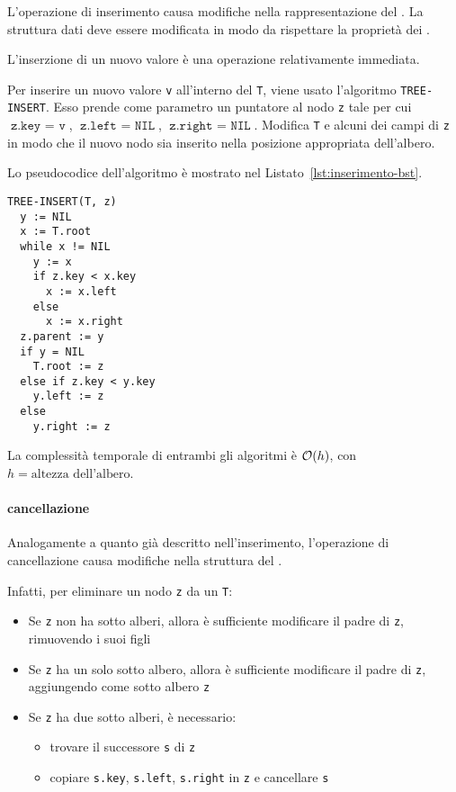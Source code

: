 \documentclass[italian, 10pt]{article}
\begin{document}
L'operazione di inserimento causa modifiche nella rappresentazione del \BST.
La struttura dati deve essere modificata in modo da rispettare la proprietà dei \BST.

L'inserzione di un nuovo valore è una operazione relativamente immediata.

Per inserire un nuovo valore \texttt{v} all'interno del \BST \texttt{T}, viene usato l'algoritmo \texttt{TREE-INSERT}.
Esso prende come parametro un puntatore al nodo \texttt{z} tale per cui \(\texttt{z.key } = \texttt{ v}\), \(\texttt{z.left } = \texttt{ NIL}\), \(\texttt{z.right } = \texttt{ NIL}\).
Modifica \texttt{T} e alcuni dei campi di \texttt{z} in modo che il nuovo nodo sia inserito nella posizione appropriata dell'albero.

Lo pseudocodice dell'algoritmo è mostrato nel Listato~\ref{lst:inserimento-bst}.

\begin{lstlisting}[style=pseudocode, caption={Inserimento di un nuovo nodo}, label={lst:inserimento-bst}]
TREE-INSERT(T, z)
  y := NIL
  x := T.root
  while x != NIL
    y := x
    if z.key < x.key
      x := x.left
    else
      x := x.right
  z.parent := y
  if y = NIL
    T.root := z
  else if z.key < y.key
    y.left := z
  else
    y.right := z
\end{lstlisting}

\bigskip
La complessità temporale di entrambi gli algoritmi è \(\mathcal{O}(h)\), con \(h = \text{altezza dell'albero}\).

\paragraph{cancellazione}
\label{par:cancellazione-bst}

Analogamente a quanto già descritto nell'inserimento, l'operazione di cancellazione causa modifiche nella struttura del \BST.

Infatti, per eliminare un nodo \texttt{z} da un \BST \texttt{T}:

\begin{itemize}
  \item Se \texttt{z} non ha sotto alberi, allora è sufficiente modificare il padre di \texttt{z}, rimuovendo i suoi figli
  \item Se \texttt{z} ha un solo sotto albero, allora è sufficiente modificare il padre di \texttt{z}, aggiungendo come sotto albero \texttt{z}
  \item Se \texttt{z} ha due sotto alberi, è necessario:
        \begin{itemize}
          \item trovare il successore \texttt{s} di \texttt{z}
          \item copiare \texttt{s.key}, \texttt{s.left}, \texttt{s.right} in \texttt{z} e cancellare \texttt{s}
        \end{itemize}
\end{itemize}
\end{document}
